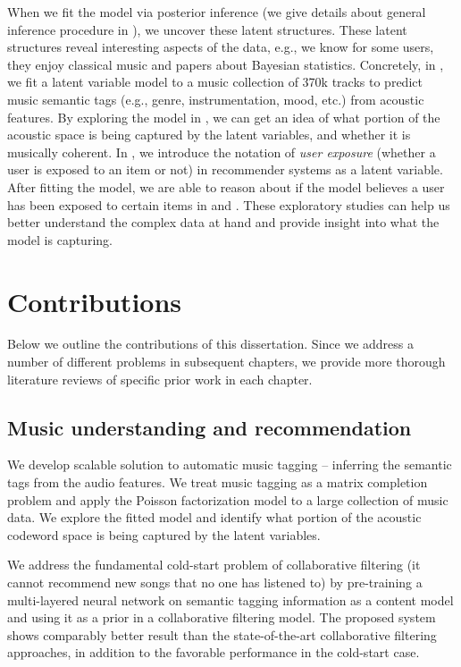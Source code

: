 When we fit the model via posterior inference (we give details about general inference procedure in ), we uncover these latent structures. These latent structures reveal interesting aspects of the data, e.g., we know for some users, they enjoy classical music and papers about Bayesian statistics. Concretely, in , we fit a latent variable model to a music collection of 370k tracks to predict music semantic tags (e.g., genre, instrumentation, mood, etc.) from acoustic features. By exploring the model in , we can get an idea of what portion of the acoustic space is being captured by the latent variables, and whether it is musically coherent. In , we introduce the notation of \textit{user exposure} (whether a user is exposed to an item or not) in recommender systems as a latent variable. After fitting the model, we are able to reason about if the model believes a user has been exposed to certain items in  and . These exploratory studies can help us better understand the complex data at hand and provide insight into what the model is capturing. 

\section{Contributions}\label{chpt:intro:sec:contribution}
Below we outline the contributions of this dissertation. Since we address a number of different problems in subsequent chapters, we provide more thorough literature reviews of specific prior work in each chapter.

\subsection{Music understanding and recommendation}
We develop scalable solution to automatic music tagging -- inferring the semantic tags from the audio features. We treat music tagging as a matrix completion problem and apply the Poisson factorization model to a large collection of music data. We explore the fitted model and identify what portion of the acoustic codeword space is being captured by the latent variables.

We address the fundamental cold-start problem of collaborative filtering (it cannot recommend new songs that no one has listened to) by pre-training a multi-layered neural network on semantic tagging information as a content model and using it as a prior in a collaborative filtering model.  The proposed system shows comparably better result than the state-of-the-art collaborative filtering approaches, in addition to the favorable performance in the cold-start case. 

